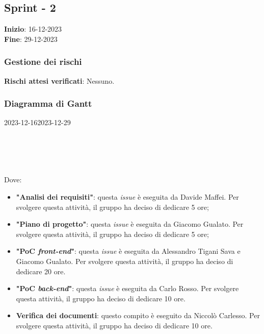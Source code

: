 \subsection{Sprint - 2}
\textbf{Inizio}: 16-12-2023 \\
\textbf{Fine}: 29-12-2023

\subsubsection{Gestione dei rischi}
\textbf{Rischi attesi verificati}: Nessuno.  

\subsubsection{Diagramma di Gantt}

\begin{ganttchart}[
		x unit=0.6cm, %
		y unit chart=0.6cm,
		bar/.style={fill=blue!50},
		bar height=0.5,
		time slot format=isodate,
		time slot unit=day,
		vgrid,
		today=2023-12-16,
		today rule/.style={draw=red, ultra thick}
	]{2023-12-16}{2023-12-29}
	 \\
	 \\
	 \\
	 \\
	 \\
\end{ganttchart}

Dove:
\begin{itemize}
	\item \textbf{"Analisi dei requisiti"}: questa \textit{issue} è eseguita da
	      Davide Maffei. Per svolgere questa attività, il gruppo ha deciso di
	      dedicare 5 ore;

	\item \textbf{"Piano di progetto"}: questa \textit{issue} è eseguita da
	      Giacomo Gualato. Per svolgere questa attività, il gruppo ha deciso
	      di dedicare 5 ore;

	\item \textbf{"PoC \textit{front-end}"}: questa \textit{issue} è eseguita
	      da Alessandro Tigani Sava e Giacomo Gualato. Per svolgere questa
	      attività, il gruppo ha deciso di dedicare 20 ore.

	\item \textbf{"PoC \textit{back-end}"}: questa \textit{issue} è eseguita
	      da Carlo Rosso. Per svolgere questa attività, il gruppo ha deciso di
	      dedicare 10 ore.

	\item \textbf{Verifica dei documenti}: questo compito è eseguito da
	      Niccolò Carlesso. Per svolgere questa attività, il gruppo ha deciso
	      di dedicare 10 ore.
\end{itemize}

